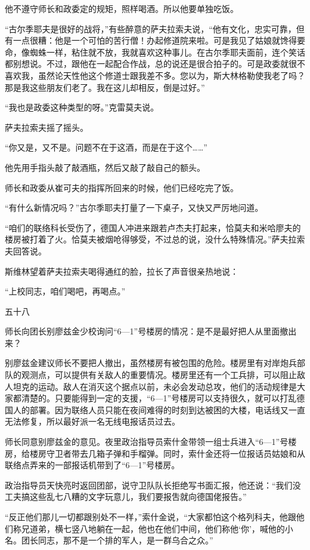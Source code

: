 他不遵守师长和政委定的规矩，照样喝酒。所以他要单独吃饭。

“古尔季耶夫是很好的战将，”有些醉意的萨夫拉索夫说，“他有文化，忠实可靠，但有一点很糟：他是一个可怕的苦行僧！办起修道院来啦。可是我见了姑娘就馋得要命，像蜘蛛一样，粘住就不放，我就喜欢这种事儿。在古尔季耶夫面前，连个笑话都别想说。不过，跟他在一起配合作战，总的说还是很合拍子的。可是政委就很不喜欢我，虽然论天性他这个修道士跟我差不多。您以为，斯大林格勒使我老了吗？那是我这些朋友们老了。我在这儿却相反，倒是过好。”

“我也是政委这种类型的呀。”克雷莫夫说。

萨夫拉索夫摇了摇头。

“你又是，又不是。问题不在于这酒，而是在于这个……”

他先用手指头敲了敲酒瓶，然后又敲了敲自己的额头。

师长和政委从崔可夫的指挥所回来的时候，他们已经吃完了饭。

“有什么新情况吗？”古尔季耶夫打量了一下桌子，又快又严厉地问道。

“咱们的联络科长受伤了，德国人冲进来跟若卢杰夫打起来，恰莫夫和米哈廖夫的楼房被打着了火。恰莫夫被烟呛得够受，不过总的说，没什么特殊情况。”萨夫拉索夫回答说。

斯维林望着萨夫拉索夫喝得通红的脸，拉长了声音很亲热地说：

“上校同志，咱们喝吧，再喝点。”

五十八

师长向团长别廖兹金少校询问“6—1”号楼房的情况：是不是最好把人从里面撤出来？

别廖兹金建议师长不要把人撤出，虽然楼房有被包围的危险。楼房里有对岸炮兵部队的观测点，可以提供有关敌人的重要情况。楼房里还有一个工兵排，可以阻止敌人坦克的运动。敌人在消灭这个据点以前，未必会发动总攻，他们的活动规律是大家都清楚的。只要能得到一定的支援，“6—1”号楼房可以支持很久，就可以打乱德国人的部署。因为联络人员只能在夜间难得的时刻到达被困的大楼，电话线又一直无法修复，所以最好派一名无线电报话员过去。

师长同意别廖兹金的意见。夜里政治指导员索什金带领一组士兵进入“6—1”号楼房，给楼房守卫者带去几箱子弹和手榴弹。同时，索什金还将一位报话员姑娘和从联络点弄来的一部报话机带到了“6—1”号楼房。

政治指导员天快亮时返回团部，说守卫队队长拒绝写书面汇报，他还说：“我们没工夫搞这些乱七八糟的文字玩意儿，我们要报吿就向德国佬报告。”

“反正他们那儿一切都跟别处不一样，”索什金说，“大家都怕这个格列科夫，他跟他们称兄道弟，横七竖八地躺在一起，他也在他们中间，他们称他‘你’，喊他的小名。团长同志，那不是一个排的军人，是一群乌合之众。”

